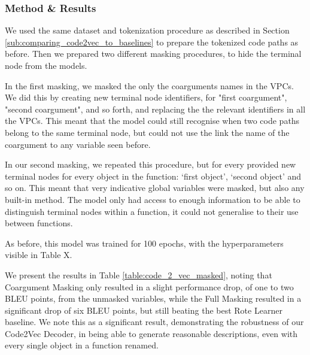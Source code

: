 \subsubsection{Method \& Results} %

We used the same dataset and tokenization procedure as described in Section \ref{sub:comparing_code2vec_to_baselines} to prepare the tokenized code paths as before.
Then we prepared two different masking procedures, to hide the terminal node from the models.

In the first masking, we masked the only the coarguments names in the VPCs.
We did this by creating new terminal node identifiers, for "first coargument", "second coargument", and so forth, and replacing the the relevant identifiers in all the VPCs.
This meant that the model could still recognise when two code paths belong to the same terminal node, but could not use the link the name of the coargument to any variable seen before.

In our second masking, we repeated this procedure, but for every provided new terminal nodes for every object in the function: `first object', `second object' and so on.
This meant that very indicative global variables were masked, but also any built-in method.
The model only had access to enough information to be able to distinguish terminal nodes within a function, it could not generalise to their use between functions.

As before, this model was trained for 100 epochs, with the hyperparameters visible in Table X.

We present the results in Table \ref{table:code_2_vec_masked}, noting that Coargument Masking only resulted in a slight performance drop, of one to two BLEU points, from the unmasked variables, while the Full Masking resulted in a significant drop of six BLEU points, but still beating the best Rote Learner baseline. 
We note this as a significant result, demonstrating the robustness of our Code2Vec Decoder, in being able to generate reasonable descriptions, even with every single object in a function renamed.




